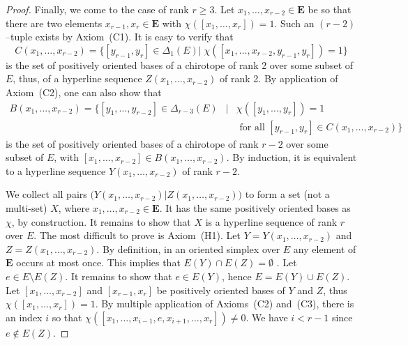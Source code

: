 \documentclass[a4paper]{amsart}
\theoremstyle{definition}
\theoremstyle{remark}
\begin{document}
\begin{proof}

  Finally, we come to the case of rank $r\ge 3$.  Let
  $x_1,\dots,x_{r-2} \in \mathbf E$ be so that there are two elements
  $x_{r-1},x_r\in \mathbf E$ with $\chi([x_1,\dots, x_r])=1$. Such an
  $(r-2)$--tuple exists by Axiom~(C1).
%
  It is easy to verify that 
  $$ C(x_1,\dots,x_{r-2}) = \{ [y_{r-1},y_r]\in \Delta_1(E) 
               |\; \chi([x_1,\dots, x_{r-2}, y_{r-1}, y_r])=1\}$$
  is the set of positively oriented bases of a chirotope of rank 2 over
  some subset of $E$, thus, of a hyperline sequence
  $Z(x_1,\dots,x_{r-2})$ of rank 2.
%
  By application of Axiom~(C2), one can also show that
  \begin{eqnarray*}
  B(x_1,\dots,x_{r-2}) = \{ [y_1,\dots, y_{r-2}]\in \Delta_{r-3}(E)
  &|& \chi([y_1,\dots, y_r])=1\\ &&\text{ for all } [y_{r-1},y_r]\in
  C(x_1,\dots,x_{r-2})\}
  \end{eqnarray*}
  is the set of positively oriented bases of
  a chirotope of rank $r-2$ over some subset of $E$,
  with $[x_1,\dots,x_{r-2}]\in B(x_1,\dots,x_{r-2})$.
  By induction, it is equivalent to a hyperline sequence 
  $Y(x_1,\dots,x_{r-2})$ of rank $r-2$.
  
  We collect all pairs $\big(Y(x_1,\dots,x_{r-2}) |
  Z(x_1,\dots,x_{r-2})\big)$ to form a set (not a multi-set)
  $X$, where $x_1,\dots,x_{r-2}\in \mathbf E$.  It has the same
  positively oriented bases as $\chi$, by construction. It remains to
  show that $X$ is a hyperline sequence of rank $r$ over $E$.
%
  The most difficult to prove is Axiom~(H1).
  Let $Y=Y(x_1,\dots,x_{r-2})$ and $Z=Z(x_1,\dots,x_{r-2})$. 
  By definition, in an oriented simplex over $E$ any element of $\mathbf
  E$ occurs at most once. This implies that $E(Y)\cap E(Z)=\emptyset$ .
%
  Let $e\in E\setminus E(Z)$. It remains to show that $e\in E(Y)$, hence
  $E=E(Y)\cup E(Z)$.  Let $[x_1,\dots,x_{r-2}]$ and $[x_{r-1},x_r]$ be
  positively oriented bases of $Y$ and $Z$, thus $\chi([x_1,\dots,
  x_r])=1$. By multiple application of Axioms~(C2) and~(C3), there is an index $i$
  so that $\chi([x_1,\dots,x_{i-1},e,x_{i+1},\dots,x_r])\not=
  0$. We have $i<r-1$ since $e\not\in E(Z)$.


\end{proof}
\end{document}
